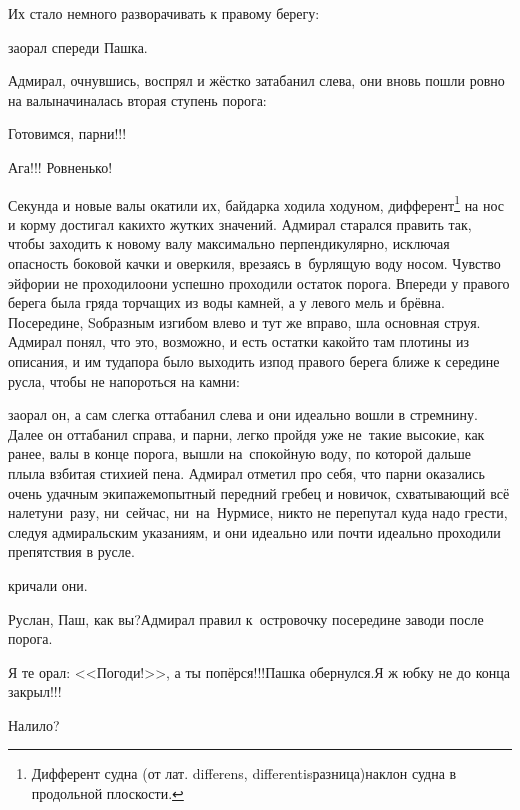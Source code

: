 Их стало немного разворачивать к правому берегу:

\mdash заорал спереди Пашка.

Адмирал, очнувшись, воспрял и жёстко затабанил слева, они вновь пошли ровно на валы\mdash начиналась вторая ступень порога:

\diagdash Готовимся, парни!!!

\diagdash Ага!!! Ровненько!

\renewcommand*{\thefootnote}{\fnsymbol{footnote}}
\setcounter{footnote}{0}
Секунда и новые валы окатили их, байдарка ходила ходуном, дифферент\footnote{Дифферент судна (от лат. differens, differentis\mdash разница)\mdash наклон судна в продольной плоскости\cite{МорскойСправочник}.} на нос и корму достигал каких\sdash то жутких значений. Адмирал старался править так, чтобы заходить к новому валу максимально перпендикулярно, исключая опасность боковой качки и оверкиля, врезаясь в~бурлящую воду носом. Чувство эйфории не проходило\mdash они успешно проходили остаток порога. Впереди у правого берега была гряда торчащих из воды камней, а у левого мель и брёвна. Посередине, S\sdash образным изгибом влево и тут же вправо, шла основная струя. Адмирал понял, что это, возможно, и есть остатки какой\sdash то там плотины из описания, и им туда\mdash пора было выходить из\sdash под правого берега ближе к середине русла, чтобы не напороться на камни:

\mdash заорал он, а сам слегка оттабанил слева и они идеально вошли в стремнину. Далее он оттабанил справа, и парни, легко пройдя уже не~такие высокие, как ранее, валы в конце порога, вышли на~спокойную воду, по которой дальше плыла взбитая стихией пена. Адмирал отметил про себя, что парни оказались очень удачным экипажем\mdash опытный передний гребец и новичок, схватывающий всё налету\mdash ни~разу, ни~сейчас, ни~на~Нурмисе, никто не перепутал куда надо грести, следуя адмиральским указаниям, и они идеально или почти идеально проходили препятствия в русле.

\mdash кричали они.

\diagdash Руслан, Паш, как вы?\mdash Адмирал правил к~островочку посередине заводи после порога.

\diagdash Я те орал: <<Погоди!>>, а ты попёрся!!!\mdash Пашка обернулся.\mdash Я ж юбку не до конца закрыл!!!

\diagdash Налило?

